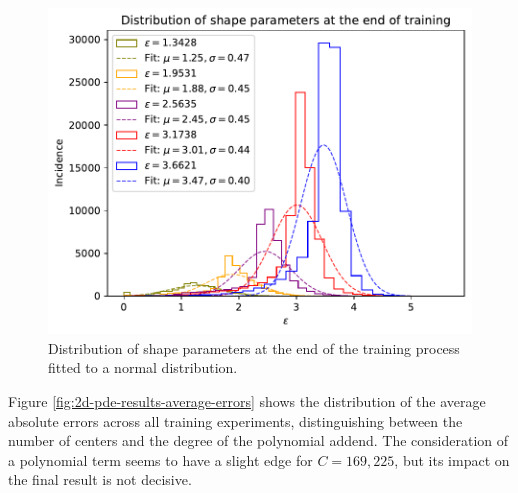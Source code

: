 \documentclass[12pt]{report} %
\begin{document}
\begin{figure}[h]
  \includegraphics[width=.8\textwidth]{imagenes/experiments/2d/pde_parabola/distribution_of_shape_parameters_at_end_of_training.pdf}
  \caption{Distribution of shape parameters at the end of the training process fitted to a normal distribution.}
  \label{fig:2d-pde-results-shape-parameters}
\end{figure}


Figure \ref{fig:2d-pde-results-average-errors} shows the distribution of the average absolute errors across all training experiments, distinguishing between the number of centers and the degree of the polynomial addend. The consideration of a polynomial term seems to have a slight edge for $C=169,225$, but its impact on the final result is not decisive. 
\end{document}
